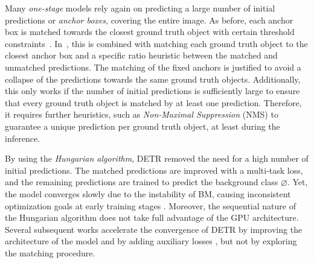 Many \emph{one-stage} models rely again on predicting a large number of initial predictions or \emph{anchor boxes}, covering the entire image. As before, each anchor box is matched towards the closest ground truth object with certain threshold constraints~\cite{redmon2016yolo,lin2017focalloss}. In~\cite{liu2016ssd}, this is combined with matching each ground truth object to the closest anchor box and a specific ratio heuristic between the matched and unmatched predictions. The matching of the fixed anchors is justified to avoid a collapse of the predictions towards the same ground truth objects. %
Additionally, this only works if the number of initial predictions is sufficiently large to ensure that every ground truth object is matched by at least one prediction. Therefore, it requires further heuristics, such as \emph{Non-Maximal Suppression} (NMS) to guarantee a unique prediction per ground truth object, at least during the inference.


By using the \emph{Hungarian algorithm}, DETR \cite{carion2020detr} removed the need for a high number of initial predictions. The matched predictions are improved with a multi-task loss, and the remaining predictions are trained to predict the background  class $\varnothing$. Yet, the model converges slowly due to the instability of BM, causing inconsistent optimization goals at early training stages \cite{li2022dndetr}. Moreover, the sequential nature of the Hungarian algorithm does not take full advantage of the GPU architecture. Several subsequent works accelerate the convergence of DETR by improving the architecture of the model \cite{zhu2020deformabledetr,liu2021dabdetr} and by adding auxiliary losses \cite{li2022dndetr}, but not by exploring the matching procedure.

